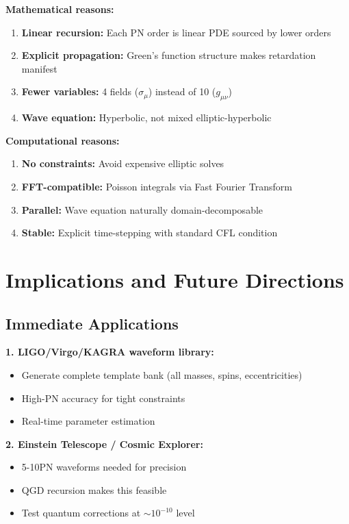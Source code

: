 \documentclass[11pt,a4paper]{article}
\theoremstyle{definition}
\theoremstyle{remark}
\begin{document}
		\textbf{Mathematical reasons:}
		\begin{enumerate}
			\item \textbf{Linear recursion:} Each PN order is linear PDE sourced by lower orders
			\item \textbf{Explicit propagation:} Green's function structure makes retardation manifest
			\item \textbf{Fewer variables:} 4 fields ($\sigma_\mu$) instead of 10 ($g_{\mu\nu}$)
			\item \textbf{Wave equation:} Hyperbolic, not mixed elliptic-hyperbolic
		\end{enumerate}
		
		\textbf{Computational reasons:}
		\begin{enumerate}
			\item \textbf{No constraints:} Avoid expensive elliptic solves
			\item \textbf{FFT-compatible:} Poisson integrals via Fast Fourier Transform
			\item \textbf{Parallel:} Wave equation naturally domain-decomposable
			\item \textbf{Stable:} Explicit time-stepping with standard CFL condition
		\end{enumerate}
		
		\section{Implications and Future Directions}
		
		\subsection{Immediate Applications}
		
		\textbf{1. LIGO/Virgo/KAGRA waveform library:}
		\begin{itemize}
			\item Generate complete template bank (all masses, spins, eccentricities)
			\item High-PN accuracy for tight constraints
			\item Real-time parameter estimation
		\end{itemize}
		
		\textbf{2. Einstein Telescope / Cosmic Explorer:}
		\begin{itemize}
			\item 5-10PN waveforms needed for precision
			\item QGD recursion makes this feasible
			\item Test quantum corrections at $\sim 10^{-10}$ level
		\end{itemize}
		
\end{document}
